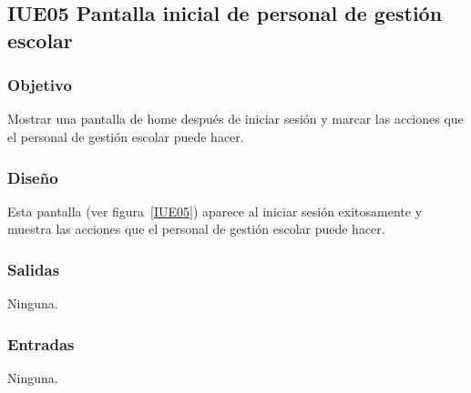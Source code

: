 \subsection{IUE05 Pantalla inicial de personal de gestión escolar}

\subsubsection{Objetivo}
Mostrar una pantalla de home después de iniciar sesión y marcar las acciones que el personal de gestión escolar puede hacer.

\subsubsection{Diseño}
Esta pantalla  (ver figura~\ref{IUE05}) aparece al iniciar sesión exitosamente y muestra las acciones que el personal de gestión escolar puede hacer. 


\subsubsection{Salidas}

Ninguna.

\subsubsection{Entradas}
Ninguna.

